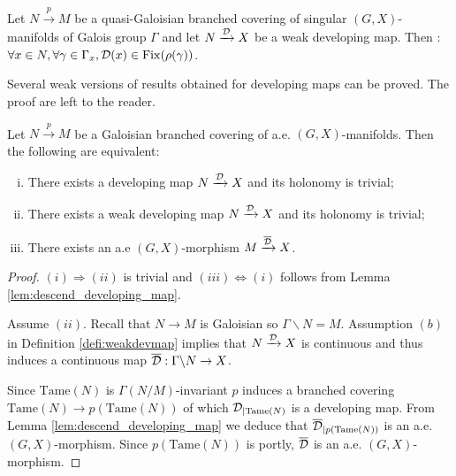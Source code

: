 \begin{rem}
 Let $N\xrightarrow{p}M$ be a quasi-Galoisian branched covering of singular $(G,X)$-manifolds of Galois group $\Gamma$ and let $N\xrightarrow{\mathcal{D}} X$ be a weak developing map. Then : 
$\forall x\in N, \forall \gamma \in \Gamma_x, \mathcal{D}(x) \in \mathrm{Fix}(\rho(\gamma))$.
\end{rem}




Several weak versions of results obtained for developing maps can be proved. The proof are left to the reader. 
\begin{lem}
 Let $N\xrightarrow{p}M$ be a Galoisian branched covering of a.e. $(G,X)$-manifolds. Then the following are equivalent:
 \begin{enumerate}[(i)]
  \item There exists a developing map $N\xrightarrow{\mathcal{D}}X$ and its holonomy is trivial;
  \item There exists a weak developing map $N\xrightarrow{\mathcal{D}}X$ and its holonomy is trivial;
  \item There exists an a.e $(G,X)$-morphism $M\xrightarrow{\overline {\mathcal{D}}}X$.
 \end{enumerate}
\end{lem}
\begin{proof}
$(i)\Rightarrow (ii)$ is trivial and $(iii)\Leftrightarrow (i)$ follows from Lemma \ref{lem:descend_developing_map}.

Assume $(ii)$. Recall that $N\rightarrow M$ is Galoisian so $\Gamma \backslash N=M$. Assumption $(b)$ in Definition \ref{defi:weakdevmap} implies that $N\xrightarrow{\mathcal{D}} X$ is continuous and thus induces a continuous map $\overline {\mathcal{D}} : \Gamma \backslash N \rightarrow   X$.


 Since $\mathrm{Tame}(N)$ is $\Gamma(N/M)$-invariant $p$ induces a branched covering $\mathrm{Tame}(N)\rightarrow p(\mathrm{Tame}(N))$ of which $\mathcal{D}_{|\mathrm{Tame}(N)}$ is a developing map.  From Lemma \ref{lem:descend_developing_map} we deduce that $\overline {\mathcal{D}}_{|p(\mathrm{Tame}(N))}$ is an a.e. $(G,X)$-morphism. Since $p(\mathrm{Tame}(N))$ is portly, $\overline {\mathcal{D}}$ is an a.e. $(G,X)$-morphism.
\end{proof}

